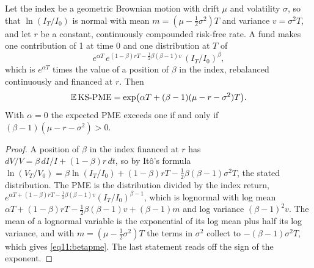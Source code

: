 \begin{chapterrefs}
\begin{proposition}\label{prop11:beta}
Let the index be a geometric Brownian motion with drift $\mu$ and volatility $\sigma$, so that
$\ln(I_T/I_0)$ is normal with mean $m=(\mu-\frac12\sigma^2)T$ and variance $v=\sigma^2T$, and let $r$ be a
constant, continuously compounded risk-free rate. A fund makes one contribution of 1 at time 0 and one distribution at $T$ of
\[
  e^{\alpha T}\,e^{(1-\beta)rT-\frac12\beta(\beta-1)v}\,(I_T/I_0)^\beta,
\]
which is $e^{\alpha T}$ times the value of a position of $\beta$ in the index, rebalanced continuously and
financed at $r$. Then
\begin{equation}\label{eq11:betapme}
  \mathbb{E}\,\mathrm{KS\text{-}PME}=\exp\bigl(\alpha T+(\beta-1)(\mu-r-\sigma^2)T\bigr).
\end{equation}
With $\alpha=0$ the expected PME exceeds one if and only if $(\beta-1)(\mu-r-\sigma^2)>0$.
\end{proposition}

\begin{proof}
A position of $\beta$ in the index financed at $r$ has $dV/V=\beta\,dI/I+(1-\beta)r\,dt$, so by Itô's formula
$\ln(V_T/V_0)=\beta\ln(I_T/I_0)+(1-\beta)rT-\frac12\beta(\beta-1)\sigma^2T$, the stated distribution. The PME
is the distribution divided by the index return,
$e^{\alpha T+(1-\beta)rT-\frac12\beta(\beta-1)v}(I_T/I_0)^{\beta-1}$, which is lognormal with log mean
$\alpha T+(1-\beta)rT-\frac12\beta(\beta-1)v+(\beta-1)m$ and log variance $(\beta-1)^2v$. The mean of a
lognormal variable is the exponential of its log mean plus half its log variance, and with
$m=(\mu-\frac12\sigma^2)T$ the terms in $\sigma^2$ collect to $-(\beta-1)\sigma^2T$, which gives
\cref{eq11:betapme}. The last statement reads off the sign of the exponent.
\end{proof}


\end{chapterrefs}
